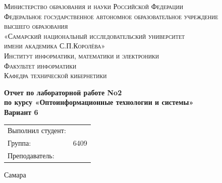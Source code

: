 \begin{titlepage}
							
	\center
							
							
	\textsc{Министерство образования и науки Российской Федерации}\\[-0.15cm]
	\textsc{Федеральное государственное автономное образовательное учреждение \\[-0.15cm] высшего образования}\\[-0.15cm] 
	\textsc{«Самарский национальный исследовательский университет \\[-0.15cm] имени академика С.П.Королёва»}\\[0.5cm]
	\textsc{Институт информатики, математики и электроники}\\[-0.7em]
	\textsc{Факультет информатики}\\[-0.7em]
	\textsc{Кафедра технической кибернетики}\\[-1em]
						
							
	\vfill\vfill
						    
							
	{\textbf{Отчет по лабораторной работе No2}}\\[-0.7em]
	{\textbf{по курсу «Оптоинформационные технологии и системы»}}\\
	{\textbf{Вариант 6}}\\
	
    \vfill\vfill\vfill\vfill\vfill\vfill\vfill\vfill\vfill
							
	\begin{minipage}{1\textwidth}
		\begin{center}
			\begin{tabularx}{\textwidth}{X l}
				Выполнил студент:        & \firstAuthorSurName \firstAuthorInitials \\
				Группа:                    & 6409                     		           \\
				Преподаватель:                  & \teacherName         		                \\
			\end{tabularx}
		\end{center}
	\end{minipage}
							
						
							
	\vfill\vfill\vfill
					
	{\centering Самара \the\year}
							
							
\end{titlepage}

